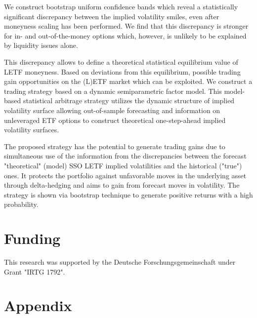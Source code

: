\documentclass{rQUF2e}
\theoremstyle{plain}
\theoremstyle{definition}
\begin{document}
	We construct bootstrap uniform confidence bands which reveal a statistically significant discrepancy between the implied volatility smiles, even after moneyness scaling has been performed. We find that this discrepancy is stronger for in- and out-of-the-money options which, however, is unlikely to be explained by liquidity issues alone.  
	
	This discrepancy allows to define a theoretical statistical equilibrium value of LETF moneyness. Based on deviations from this equilibrium, possible trading gain opportunities on the (L)ETF market which can be exploited. We construct a trading strategy based on a dynamic semiparametric factor model. This model-based statistical arbitrage strategy utilizes the dynamic structure of implied volatility surface allowing out-of-sample forecasting and information on unleveraged ETF options to construct theoretical one-step-ahead implied volatility surfaces. 
	
	The proposed strategy has the potential to generate trading gains due to simultaneous use of the information from the discrepancies between the forecast "theoretical" (model) SSO LETF implied volatilities and the historical ("true") ones. It protects the portfolio against unfavorable moves in the underlying asset through delta-hedging and aims to gain from forecast moves in volatility. The strategy is shown via bootstrap technique to generate positive returns with a high probability. 
	
	
	\section*{Funding}
	This research was supported by the Deutsche Forschungsgemeinschaft under Grant "IRTG 1792".
	
	\newpage
	
	
	
	
	\newpage
	
	
	
	\section{Appendix}
	
\end{document}
